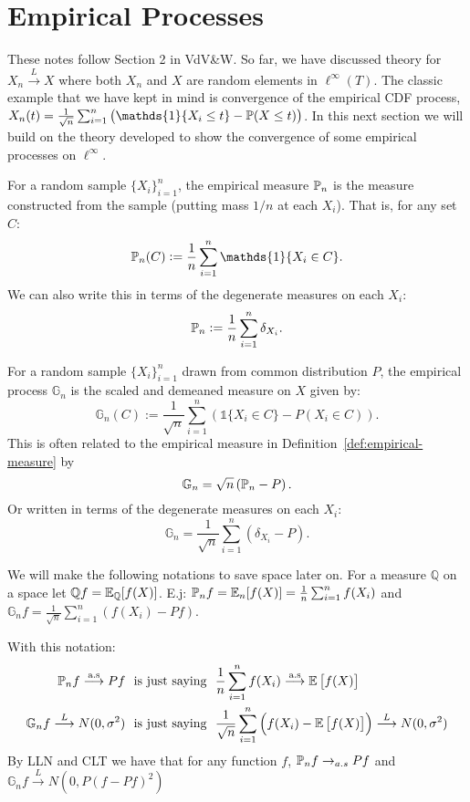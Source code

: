 \section{Empirical Processes}

These notes follow Section 2 in VdV\&W. So far, we have discussed theory for \(X_n \overset{L}{\to} X\) where both \(X_n\) and  \(X\) are random elements in  \(\ell^\infty(T)\). The classic example that we have kept in mind is convergence of the empirical CDF process, \(X_n(t) = \frac{1}{\sqrt{n}}\sum_{i=1}^n \left(\mathds{1}\{X_i \leq t\} - \P(X\leq t)\right)\). In this next section we will build on the theory developed to show the convergence of some empirical processes on \(\ell^\infty\).

\begin{definition}
	\label{def:empirical-measure}
	For a random sample \(\{X_i\}_{i=1}^n\), the empirical measure \(\P_n\) is the measure constructed from the sample (putting mass \(1/n\) at each  \(X_i\)). That is, for any set \(C\):
	 \[
		 \P_n(C) := \frac{1}{n}\sum_{i=1}^n \mathds{1}\{X_i \in C\}  
	.\]
	We can also write this in terms of the degenerate measures on each \(X_i\):
	 \[
		 \P_n := \frac{1}{n}\sum_{i=1}^n \delta_{X_i} 
	.\] 
\end{definition}

\begin{definition}
	\label{def:empirical-process}
	For a random sample \(\{X_i\}_{i=1}^n\) drawn from common distribution \(P\), the empirical process \(\mathbb{G}_n\) is the scaled and demeaned measure on \(X\) given by:
	\[\mathbb{G}_n(C) := \frac{1}{\sqrt{n}}\sum_{i=1}^n \left(\mathds{1}\{X_i \in C\} - P(X_i \in C)\right).\]
	This is often related to the empirical measure in Definition~\ref{def:empirical-measure} by
	\[
		\mathbb{G}_n = \sqrt{n}\left(\P_n - P\right)
	.\]
	Or written in terms of the degenerate measures on each \(X_i\):
	 \[
		 \mathbb{G}_n = \frac{1}{\sqrt{n}}\sum_{i=1}^n \left(\delta_{X_i}-P\right) 
	.\] 
\end{definition}

\begin{remark*}[Notation]
    \label{rem:ep-notation}
	We will make the following notations to save space later on. For a measure \(\mathbb{Q}\) on a space let \(\mathbb{Q}f = \E_{\mathbb{Q}}[f(X)]\). E.j: \(\P_nf = \E_{n}[f(X)] = \frac{1}{n}\sum_{i=1}^n f(X_i) \) and \(\mathbb{G}_n f = \frac{1}{\sqrt{n}}\sum_{i=1}^n \left(f(X_i) - Pf\right)\).

	With this notation:
	\begin{align*}
		\P_nf\overset{\text{a.s}}{\longrightarrow}Pf&\hbox{  }\text{ is just saying }\hbox{ }\frac{1}{n}\sum_{i=1}^n f(X_i)\overset{\text{a.s}}{\longrightarrow}\E\left[f(X)\right]\\ 
		\mathbb{G}_nf\overset{L}{\longrightarrow}N(0,\sigma^2)&\hbox{  }\text{ is just saying }\hbox{  }\frac{1}{\sqrt{n}}\sum_{i=1}^n \left(f(X_i)-\E\left[f(X)\right]\right)\overset{L}{\longrightarrow}N(0,\sigma^2) 
	\end{align*}
	By LLN and CLT we have that for any function \(f\),  \(\P_nf \to_{a.s}Pf\) and \(\mathbb{G}_nf \overset{L}{\to}N\left(0,P\left(f-Pf\right)^2\right)\)
\end{remark*}

